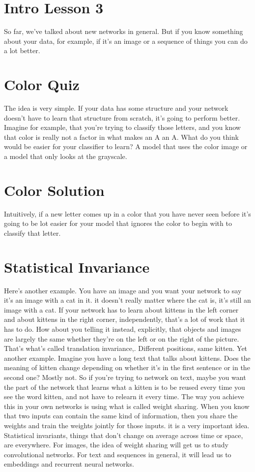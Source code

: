 \documentclass{article}
\begin{document}
\section{Intro Lesson 3}
So far, we've talked about
new networks in general.
But if you know something about your
data, for example, if it's an image or
a sequence of things you
can do a lot better.
\section{Color Quiz}
The idea is very simple.
If your data has some structure and
your network doesn't have to
learn that structure from scratch,
it's going to perform better.
Imagine for example, that you're
trying to classify those letters, and
you know that color is really not
a factor in what makes an A an A.
What do you think would be easier for
your classifier to learn?
A model that uses the color image or a
model that only looks at the grayscale.
\section{Color Solution}
Intuitively, if a new letter comes up in
a color that you have never seen before
it's going to be lot easier for
your model that ignores the color to
begin with to classify that letter.
\section{Statistical Invariance}
Here's another example.
You have an image and
you want your network to say
it's an image with a cat in it.
it doesn't really matter where the cat
is, it's still an image with a cat.
If your network has to learn about
kittens in the left corner and
about kittens in the right corner,
independently, that's a lot
of work that it has to do.
How about you telling it instead,
explicitly, that objects and images
are largely the same whether they're on
the left or on the right of the picture.
That's what's called
translation invariance,.
Different positions, same kitten.
Yet another example.
Imagine you have a long text
that talks about kittens.
Does the meaning of kitten
change depending on whether
it's in the first sentence or
in the second one?
Mostly not.
So if you're trying to network on text,
maybe you want the part of
the network that learns what
a kitten is to be reused
every time you see the word kitten,
and not have to relearn it every time.
The way you achieve this in your own
networks is using what is called
weight sharing.
When you know that two inputs can
contain the same kind of information,
then you share the weights and train
the weights jointly for those inputs.
it is a very important idea.
Statistical invariants, things that
don't change on average across time or
space, are everywhere.
For images,
the idea of weight sharing will get
us to study convolutional networks.
For text and sequences in general,
it will lead us to embeddings and
recurrent neural networks.
\end{document}
